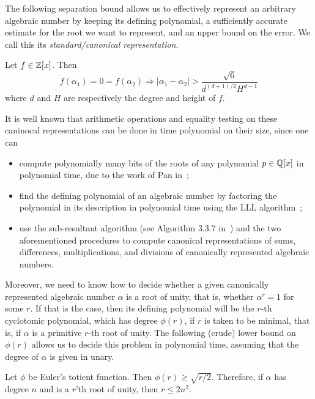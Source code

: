 The following separation bound allows us to effectively represent an arbitrary algebraic number by keeping its defining polynomial, a sufficiently accurate estimate for the root we want to represent, and an upper bound on the error. We call this its \emph{standard/canonical representation}.

\begin{lemma}[Mignotte]
Let $f\in\mathbb{Z}[x]$. Then
\begin{equation}
f(\alpha_1)=0=f(\alpha_2)\Rightarrow \lvert \alpha_1-\alpha_2\rvert>\frac{\sqrt{6}}{d^{(d+1)/2}H^{d-1}}
\end{equation}
where $d$ and $H$ are respectively the degree and height of $f$.
\end{lemma}

It is well known that arithmetic operations and equality testing on these caninocal representations can be done in time polynomial on their size, since one can
\begin{itemize}
\item compute polynomially many bits of the roots of any polynomial $p\in\mathbb{Q}[x]$ in polynomial time, due to the work of Pan in~\cite{Pan97};
\item find the defining polynomial of an algebraic number by factoring the polynomial in its description in polynomial time using the LLL algorithm~\cite{LenstraLenstraLovasz1982};
\item use the sub-resultant algorithm (see Algorithm 3.3.7 in~\cite{Coh93}) and the two aforementioned procedures to compute canonical representations of sums, differences, multiplications, and divisions of canonically represented algebraic numbers.
\end{itemize}

Moreover, we need to know how to decide whether a given canonically represented algebraic number $\alpha$ is a root of unity, that is, whether $\alpha^r=1$ for some $r$. If that is the case, then its defining polynomial will be the $r$-th cyclotomic polynomial, which has degree $\phi(r)$, if $r$ is taken to be minimal, that is, if $\alpha$ is a primitive $r$-th root of unity. The following (crude) lower bound on $\phi(r)$ allows us to decide this problem in polynomial time, assuming that the degree of $\alpha$ is given in unary.

\begin{lemma}
    Let $\phi$ be Euler's totient function. Then $\phi(r)\geq\sqrt{r/2}$. Therefore, if $\alpha$ has degree $n$ and is a $r$'th root of unity, then $r\leq 2n^2$.
\end{lemma}

